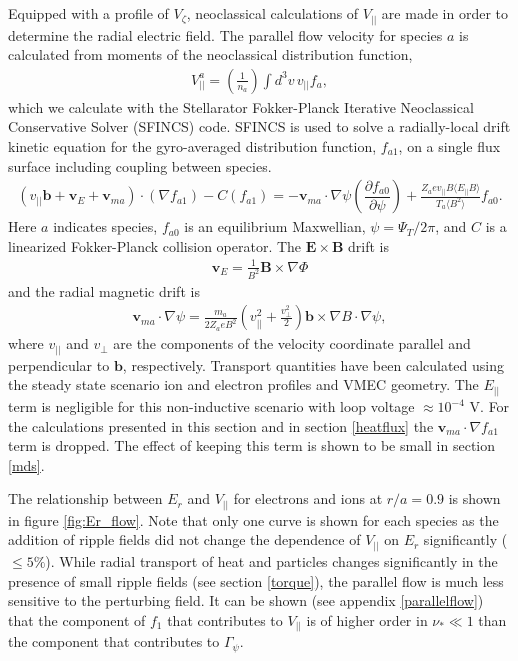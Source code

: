 \documentclass{article}
\numberwithin{figure}{section}
\numberwithin{equation}{section}
\newcommand{\partder}[2]{\dfrac{\partial  #1}{\partial  #2}} %
\begin{document}
Equipped with a profile of $V_{\zeta}$, neoclassical calculations of $V_{||}$ are made in order to determine the radial electric field. The parallel flow velocity for species $a$ is calculated from moments of the neoclassical distribution function,
\begin{gather}
V^a_{||} = \left(\frac{1}{n_a}\right) \int d^3 v \, v_{||} f_a,
\label{eq:parallelflow}
\end{gather}
which we calculate with the Stellarator Fokker-Planck Iterative Neoclassical Conservative Solver (SFINCS) \cite{Landreman2014} code.
SFINCS is used to solve a radially-local drift kinetic equation for the gyro-averaged distribution function, $f_{a1}$, on a single flux surface including coupling between species. 
\begin{gather}
( v_{||} \bm{b} + \bm{v}_E + \bm{v}_{ma}) \cdot (\nabla f_{a1})  - C(f_{a1}) = - \bm{v}_{ma} \cdot \nabla \psi \left( \partder{f_{a0}}{\psi} \right) + \frac{Z_a e v_{||} B \langle E_{||} B \rangle}{T_a \langle B^2 \rangle } f_{a0}.
\label{kineticequation}
\end{gather} 
\hspace{-1mm}
Here $a$ indicates species, $f_{a0}$ is an equilibrium Maxwellian, $\psi = \Psi_T/2\pi$, and $C$ is a linearized Fokker-Planck collision operator. The $\bm{E} \times \bm{B}$ drift is 
\begin{gather}
\bm{v}_E = \frac{1}{B^2} \bm{B} \times \nabla \Phi
\end{gather} 
and the radial magnetic drift is
\begin{gather}
\bm{v}_{ma} \cdot \nabla \psi = \frac{m_a }{2Z_a e B^2} \left(v_{||}^2 + \frac{v_{\perp}^2}{2} \right) \bm{b} \times \nabla B \cdot \nabla \psi,
\label{magneticdrift}
\end{gather} 
where $v_{||}$ and $v_{\perp}$ are the components of the velocity coordinate parallel and perpendicular to $\bm{b}$, respectively. Transport quantities have been calculated using the steady state scenario ion and electron profiles and VMEC geometry. The $E_{||}$ term is negligible for this non-inductive scenario with loop voltage $ \approx 10^{-4}$ V. For the calculations presented in this section and in section \ref{heatflux} the $\bm{v}_{ma} \cdot \nabla f_{a1}$ term is dropped. The effect of keeping this term is shown to be small in section \ref{mds}.

The relationship between $E_r$ and $V_{||}$ for electrons and ions at $r/a = 0.9$ is shown in figure \ref{fig:Er_flow}. Note that only one curve is shown for each species as the addition of ripple fields did not change the dependence of $V_{||}$ on $E_r$ significantly ($\leq 5 \%$). While radial transport of heat and particles changes significantly in the presence of small ripple fields (see section \ref{torque}), the parallel flow is much less sensitive to the perturbing field. It can be shown (see appendix \ref{parallelflow}) that the component of $f_1$ that contributes to $V_{||}$ is of higher order in $\nu_* \ll 1 $ than the component that contributes to $\Gamma_{\psi}$. 
\end{document}
